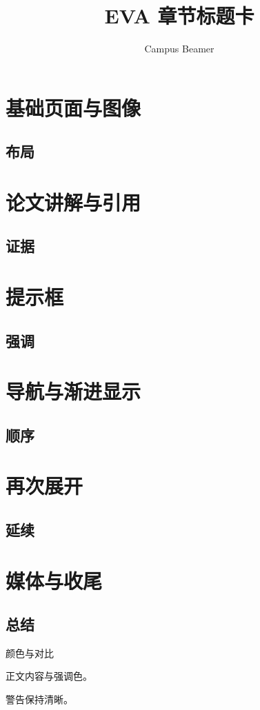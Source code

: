\documentclass[theme=eva]{campusbeamer}
\title{EVA 章节标题卡}
\author{Campus Beamer}
\date{}
\begin{document}
\maketitle
\section{基础页面与图像}
\subsection{布局}
\section{论文讲解与引用}
\subsection{证据}
\section{提示框}
\subsection{强调}
\section{导航与渐进显示}
\subsection{顺序}
\section{再次展开}
\subsection{延续}
\section{媒体与收尾}
\subsection{总结}
\begin{frame}{颜色与对比}
  \begin{tipbox}正文内容与强调色。\end{tipbox}
  \begin{alertbox}警告保持清晰。\end{alertbox}
\end{frame}
\backmatter
\end{document}
